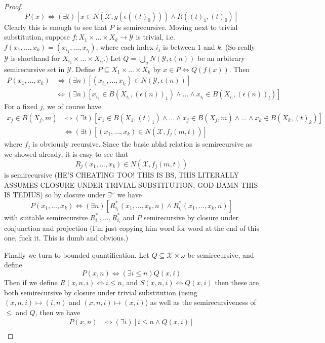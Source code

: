 \documentclass{article}
\theoremstyle{definition}
\theoremstyle{plain}
\begin{document}
\begin{proof}
\[ P(x) \iff (\exists t)[x \in N(\mathcal{X},g(\epsilon((t)_0))) \wedge R((t)_1,(t)_0)] \]
Clearly this is enough to see that $P$ is semirecursive. Moving next to trivial substitution, suppose $f:X_1 \times \ldots \times X_k \to \mathcal{Y}$ is trivial, i.e. $f(x_1,...,x_k) = (x_{i_1},...,x_{i_l})$, where each index $i_j$ is between $1$ and $k$. (So really $\mathcal{Y}$ is shorthand for $X_{i_1} \times \ldots \times X_{i_l}$.) Let $Q = \bigcup_n N(\mathcal{Y},\epsilon(n))$ be an arbitrary semirecursive set in $\mathcal{Y}$. Define $P \subseteq X_1 \times \ldots \times X_k$ by $x \in P \iff Q(f(x))$. Then
\begin{align}
	P(x_1,...,x_k) &\iff (\exists n)[(x_{i_1},...,x_{i_l}) \in N(\mathcal{Y},\epsilon(n))] \\
				   &\iff (\exists n)[x_{i_1} \in B(X_{i_1},(\epsilon(n))_1) \wedge \ldots \wedge x_{i_l} \in B(X_{i_l},(\epsilon(n))_l)]
\end{align}
For a fixed $j$, we of course have
\begin{align}
	x_j \in B(X_j,m) &\iff (\exists t)[x_1 \in B(X_1,(t)_1) \wedge \ldots \wedge x_j \in B(X_j,m) \wedge \ldots \wedge x_k \in B(X_k,(t)_k)]\\
					 &\iff (\exists t)[(x_1,...,x_k) \in N(\mathcal{X},f_j(m,t))]
\end{align}
where $f_j$ is obviously recursive. Since the basic nbhd relation is semirecursive as we showed already, it is easy to see that \[ R_j(x_1,...,x_k) \in N(\mathcal{X},f_j(m,t)) \]
is semirecursive (HE'S CHEATING TOO! THIS IS BS, THIS LITERALLY ASSUMES CLOSURE UNDER TRIVIAL SUBSTITUTION, GOD DAMN THIS IS TEDIUS) so by closure under $\exists^{\omega}$ we have 
\[ P(x_1,...,x_k) \iff (\exists n)[R^*_{i_1}(x_1,...,x_k,n) \wedge R^*_{i_l}(x_1,...,x_k,n)] \]
with suitable semirecursive $R^*_{i_1},...,R^*_{i_l}$ and $P$ semirecursive by closure under conjunction and projection (I'm just copying him word for word at the end of this one, fuck it. This is dumb and obvious.)
\par Finally we turn to bounded quantification. Let $Q \subseteq \mathcal{X} \times \omega$ be semirecursive, and define 
\[ P(x,n) \iff (\exists i \leq n)Q(x,i) \]
Then if we define $R(x,n,i) \iff i \leq n$, and $S(x,n,i) \iff Q(x,i)$ then these are both semirecursive by closure under trivial substitution (using $(x,n,i) \mapsto (i,n)$ and $(x,n,i) \mapsto (x,i)$) as well as the semirecursiveness of $\leq$ and $Q$, then we have 
\begin{align}
	P(x,n) &\iff (\exists i)[i \leq n \wedge Q(x,i)] \\

\end{align}
\end{proof}
\end{document}
